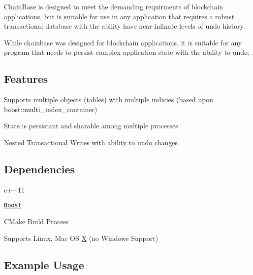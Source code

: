 Chain\+Base is designed to meet the demanding requirments of blockchain applications, but is suitable for use in any application that requires a robust transactional database with the ability have near-\/infinate levels of undo history.

While chainbase was designed for blockchain applications, it is suitable for any program that needs to persist complex application state with the ability to undo.

\subsection*{Features}


\begin{DoxyItemize}
\item Supports multiple objects (tables) with multiple indicies (based upon boost\+::multi\+\_\+index\+\_\+container)
\item State is persistant and sharable among multiple processes
\item Nested Transactional Writes with ability to undo changes
\end{DoxyItemize}

\subsection*{Dependencies}


\begin{DoxyItemize}
\item c++11
\item \href{http://www.boost.org/}{\tt Boost}
\item C\+Make Build Process
\item Supports Linux, Mac OS \mbox{\hyperlink{class_x}{X}} (no Windows Support)
\end{DoxyItemize}

\subsection*{Example Usage}


